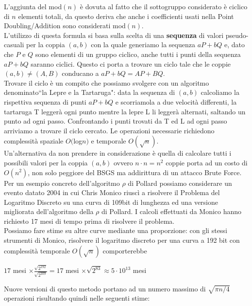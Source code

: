\documentclass[a4paper,12pt]{tesiinfo}
\newcommand\ddfrac[2]{\frac{\displaystyle #1}{\displaystyle #2}}
\begin{document}
L'aggiunta del mod$(n)$ \`e dovuta al fatto che il sottogruppo considerato \`e ciclico di $n$ elementi totali, da questo deriva che anche i coefficienti usati nella Point Doubling/Addition sono considerati mod$(n)$.
\\
L'utilizzo di questa formula si basa sulla scelta di una \textbf{sequenza} di valori pseudo-casuali per la coppia $(a, b)$ con la quale generiamo la sequenza $aP+bQ$ e, dato che $P$ e $Q$ sono elementi di un gruppo ciclico, anche tutti i punti della sequenza $aP+bQ$ saranno ciclici. Questo ci porta a trovare un ciclo tale che le coppie $(a, b) \ne (A, B)$ conducano a $aP+bQ = AP+BQ$.
\\
Trovare il ciclo \`e un compito che possiamo svolgere con un algoritmo denominato``la Lepre e la Tartaruga": data la sequenza di $(a, b)$ calcoliamo la rispettiva sequenza di punti $aP+bQ$ e scorriamola a due velocit\`a differenti, la tartaruga T legger\`a ogni punto mentre la lepre L li legger\`a alternati, saltando un punto ad ogni passo. Confrontando i punti trovati da T ed L ad ogni passo arriviamo a trovare il ciclo cercato. Le operazioni necessarie richiedono complessit\`a spaziale $O($log$n)$ e temporale $O(\sqrt{n})$.
\\
Un'alternativa da non prendere in considerazione \`e quella di calcolare tutti i possibili valori per la coppia $(a, b)$ ovvero $n \cdot n = n^2$ coppie porta ad un costo di $O(n^2)$, non solo peggiore del BSGS ma addirittura di un attacco Brute Force.
\\
Per un esempio concreto dell'algoritmo $\rho$ di Pollard possiamo considerare un evento datato 2004 in cui Chris Monico riusc\`i a risolvere il Problema del Logaritmo Discreto su una curva di 109bit di lunghezza ed una versione migliorata dell'algoritmo della $\rho$ di Pollard. I calcoli effettuati da Monico hanno richiesto 17 mesi di tempo prima di risolvere il problema. 
\\
Possiamo fare stime su altre curve mediante una proporzione: con gli stessi strumenti di Monico, risolvere il logaritmo discreto per una curva a 192 bit con complessit\`a temporale $O(\sqrt{n})$ comporterebbe
\begin{center}
    $17$ mesi $\times \ddfrac{\sqrt{2^{192}}}{\sqrt{2^{109}}} = 17$ mesi $\times \sqrt{2^{83}} \approx 5 \cdot 10^{13}$ mesi\\
\end{center}
Nuove versioni di questo metodo portano ad un numero massimo di $\sqrt{\pi n \big / 4}$ operazioni risultando quindi nelle seguenti stime:
\end{document}
